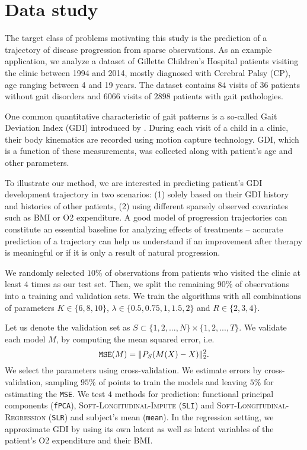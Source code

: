 \documentclass[preprint]{imsart}
\numberwithin{equation}{section}
\theoremstyle{plain}
\begin{document}
\section{Data study}

The target class of problems motivating this study is the prediction of a trajectory of disease progression from sparse observations. As an example application, we analyze a dataset of Gillette Children's Hospital patients visiting the clinic between 1994 and 2014, mostly diagnosed with Cerebral Palsy (CP), age ranging between 4 and 19 years. The dataset contains $84$ visits of $36$ patients without gait disorders and $6066$ visits of $2898$ patients with gait pathologies. 

One common quantitative characteristic of gait patterns is a so-called Gait Deviation Index (GDI) introduced by \citet{schwartz2008gait}. During each visit of a child in a clinic, their body kinematics are recorded using motion capture technology. GDI, which is a function of these measurements, was collected along with patient's age and other parameters.

To illustrate our method, we are interested in predicting patient's GDI development trajectory in two scenarios: (1) solely based on their GDI history and histories of other patients, (2) using different sparsely observed covariates such as BMI or O2 expenditure. A good model of progression trajectories can constitute an essential baseline for analyzing effects of treatments -- accurate prediction of a trajectory can help us understand if an improvement after therapy is meaningful or if it is only a result of natural progression.

We randomly selected $10\%$ of observations from patients who visited the clinic at least $4$ times as our test set. Then, we split the remaining $90\%$ of observations into a training and validation sets. We train the algorithms with all combinations of parameters $K \in \{6,8,10\}$, $\lambda \in \{0.5, 0.75, 1, 1.5, 2\}$ and $R \in \{2,3,4\}$.

Let us denote the validation set as $S \subset \{1,2,...,N\} \times \{1,2,...,T\}$. We validate each model $M$, by computing the mean squared error, i.e.
\[
\verb|MSE|(M) = \|P_S(M(X) - X)\|_2^2.
\]
We select the parameters using cross-validation. We estimate errors by cross-validation, sampling $95\%$ of points to train the models and leaving $5\%$ for estimating the \verb|MSE|. We test $4$ methods for prediction: functional principal components (\verb|fPCA|), \textsc{Soft-Longitudinal-Impute} (\verb|SLI|) and \textsc{Soft-Longitudinal-Regression} (\verb|SLR|) and subject's mean (\verb|mean|). In the regression setting, we approximate GDI by using its own latent as well as latent variables of the patient's O2 expenditure and their BMI.
\end{document}
